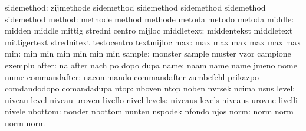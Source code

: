                sidemethod: zijmethode                sidemethod
                           sidemethod                sidemethod
                           sidemethod                sidemethod
                   method: methode                   method
                           methode                   metoda
                           metodo                    metoda
                   middle: midden                    middle
                           mittig                    stredni
                           centro                    mijloc %
               middletext: middentekst               middletext
                           mittigertext              strednitext
                           testocentro               textmijloc %
                      max: max                       max
                           max                       max
                           max                       max
                      min: min                       min
                           min                       min
                           min                       min
                   sample: monster                   sample
                           muster                    vzor
                           campione                  exemplu
                    after: na                        after
                           nach                      po
                           dopo                      dupa
                     name: naam                      name
                           name                      jmeno
                           nome                      nume
             commandafter: nacommando                commandafter
                           zumbefehl                 prikazpo
                           comdandodopo              comandadupa
                     ntop: nboven                    ntop
                           noben                     nvrsek
                           ncima                     nsus
                    level: niveau                    level
                           niveau                    uroven
                           livello                   nivel
                   levels: niveaus                   levels
                           niveaus                   urovne
                           livelli                   nivele
                  nbottom: nonder                    nbottom
                           nunten                    nspodek
                           nfondo                    njos
                     norm: norm                      norm
                           norm                      norm
